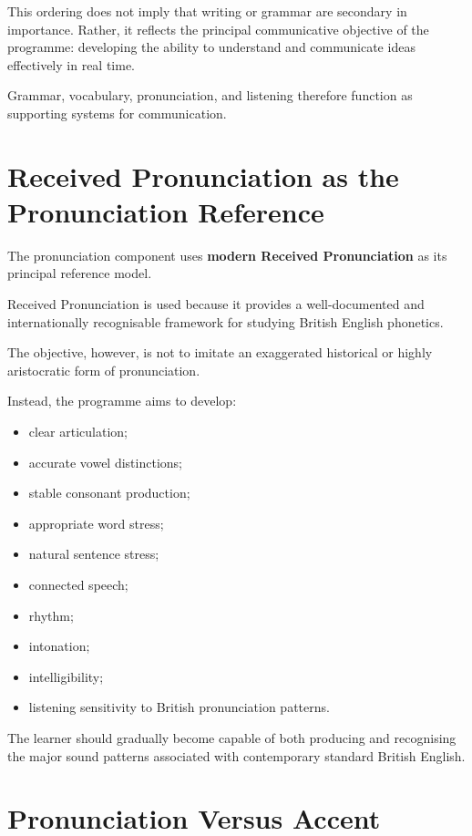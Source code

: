 This ordering does not imply that writing or grammar are secondary in importance. Rather, it reflects the principal communicative objective of the programme: developing the ability to understand and communicate ideas effectively in real time.

Grammar, vocabulary, pronunciation, and listening therefore function as supporting systems for communication.

\section*{Received Pronunciation as the Pronunciation Reference}

The pronunciation component uses \textbf{modern Received Pronunciation} as its principal reference model.

Received Pronunciation is used because it provides a well-documented and internationally recognisable framework for studying British English phonetics.

The objective, however, is not to imitate an exaggerated historical or highly aristocratic form of pronunciation.

Instead, the programme aims to develop:

\begin{itemize}
    \item clear articulation;
    \item accurate vowel distinctions;
    \item stable consonant production;
    \item appropriate word stress;
    \item natural sentence stress;
    \item connected speech;
    \item rhythm;
    \item intonation;
    \item intelligibility;
    \item listening sensitivity to British pronunciation patterns.
\end{itemize}

The learner should gradually become capable of both producing and recognising the major sound patterns associated with contemporary standard British English.

\section*{Pronunciation Versus Accent}

